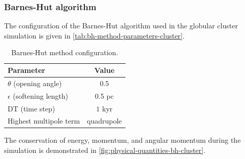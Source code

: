\subsubsection{Barnes-Hut algorithm}
The configuration of the Barnes-Hut algorithm used in the globular cluster simulation is given in \autoref{tab:bh-method-parameters-cluster}.
\begin{table}[htp]
    \centering
    \begin{tabular}{|l|c|}
        \hline
        \textbf{Parameter}            & \textbf{Value} \\
        \hline
        $\theta$ (opening angle)      & 0.5            \\
        $\epsilon$ (softening length) & 0.5 pc         \\
        DT (time step)                & $1$ kyr        \\
        Highest multipole term        & quadrupole     \\
        \hline
    \end{tabular}
    \caption{Barnes-Hut method configuration.}
    \label{tab:bh-method-parameters-cluster}
\end{table}
The conservation of energy, momentum, and angular momentum during the simulation is demonstrated in \autoref{fig:physical-quantities-bh-cluster}.
